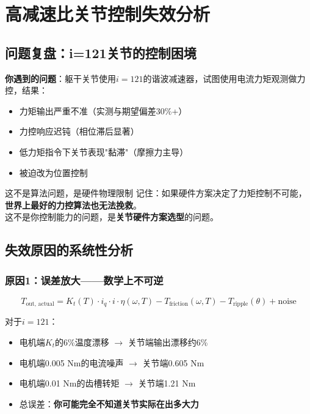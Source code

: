 \chapter{高减速比关节控制失效分析}
\label{ch:high_ratio_failure}

\section{问题复盘：i=121关节的控制困境}

\textbf{你遇到的问题}：躯干关节使用$i=121$的谐波减速器，试图使用电流力矩观测做力控，结果：
\begin{itemize}
  \item 力矩输出严重不准（实测与期望偏差30\%+）
  \item 力控响应迟钝（相位滞后显著）
  \item 低力矩指令下关节表现"黏滞"（摩擦力主导）
  \item 被迫改为位置控制
\end{itemize}

\begin{keyinsight}{这不是算法问题，是硬件物理限制}
记住：如果硬件方案决定了力矩控制不可能，\\
\textbf{世界上最好的力控算法也无法挽救}。\\
这不是你控制能力的问题，是\textbf{关节硬件方案选型}的问题。
\end{keyinsight}

\section{失效原因的系统性分析}

\subsection{原因1：误差放大——数学上不可逆}

\begin{equation}
T_{\text{out, actual}} = K_t(T) \cdot i_q \cdot i \cdot \eta(\omega, T) - T_{\text{friction}}(\omega, T) - T_{\text{ripple}}(\theta) + \text{noise}
\end{equation}

对于$i=121$：
\begin{itemize}
  \item 电机端$K_t$的6\%温度漂移 $\rightarrow$ 关节端输出漂移约6\%
  \item 电机端0.005 Nm的电流噪声 $\rightarrow$ 关节端0.605 Nm
  \item 电机端0.01 Nm的齿槽转矩 $\rightarrow$ 关节端1.21 Nm
  \item 总误差：\textbf{你可能完全不知道关节实际在出多大力}
\end{itemize}

